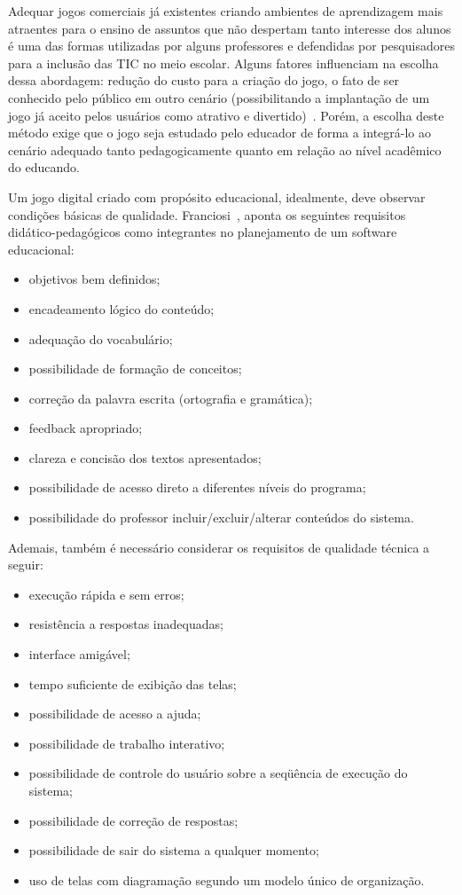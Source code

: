 Adequar jogos comerciais já existentes criando ambientes de aprendizagem mais atraentes para o ensino de assuntos que não despertam tanto interesse dos alunos é uma das formas utilizadas por alguns professores e defendidas por pesquisadores para a inclusão das \acrshort{TIC} no meio escolar. Alguns fatores influenciam na escolha dessa abordagem: redução do custo para a criação do jogo, o fato de ser conhecido pelo público em outro cenário (possibilitando a implantação de um jogo já aceito pelos usuários como atrativo e divertido)~\cite{cechin_adaptacao_2012}. Porém, a escolha deste método exige que o jogo seja estudado pelo educador de forma a integrá-lo ao cenário adequado tanto pedagogicamente quanto em relação ao nível acadêmico do educando.

Um jogo digital criado com propósito educacional, idealmente, deve observar condições básicas  de qualidade. Franciosi~\cite{franciosi_modelagem_1997}, aponta os seguintes requisitos didático-pedagógicos como integrantes no planejamento de um software educacional:

\begin{itemize}
\item objetivos bem definidos;
\item encadeamento lógico do conteúdo;
\item adequação do vocabulário;
\item possibilidade de formação de conceitos;
\item correção da palavra escrita (ortografia e gramática);
\item feedback apropriado;
\item clareza e concisão dos textos apresentados;
\item possibilidade de acesso direto a diferentes níveis do programa;
\item possibilidade do professor incluir/excluir/alterar conteúdos do sistema.
\end{itemize}

Ademais, também é necessário considerar os requisitos de qualidade técnica a seguir:
\begin{itemize}
\item execução rápida e sem erros;
\item resistência a respostas inadequadas;
\item interface amigável;
\item tempo suficiente de exibição das telas;
\item possibilidade de acesso a ajuda;
\item possibilidade de trabalho interativo;
\item possibilidade de controle do usuário sobre a seqüência de execução do sistema;
\item possibilidade de correção de respostas;
\item possibilidade de sair do sistema a qualquer momento;
\item uso de telas com diagramação segundo um modelo único de organização.
\end{itemize}


